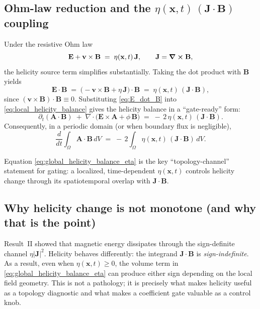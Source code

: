 \documentclass[11pt]{article}
\theoremstyle{plain}
\theoremstyle{definition}
\theoremstyle{remark}
\newcommand{\diver}{\nabla\cdot}
\newcommand{\A}{\mathbf{A}}
\newcommand{\B}{\mathbf{B}}
\newcommand{\E}{\mathbf{E}}
\newcommand{\J}{\mathbf{J}}
\newcommand{\vfield}{\mathbf{v}}
\begin{document}
\subsection{Ohm-law reduction and the $\eta(\mathbf{x},t)\,(\J\cdot\B)$ coupling}\label{sec:result_helicity_ohm}
Under the resistive Ohm law
\begin{equation}\label{eq:ohm_R3}
  \E + \vfield\times\B \;=\; \eta(\mathbf{x},t)\,\J,
  \qquad \J=\curl\B,
\end{equation}
the helicity source term simplifies substantially. Taking the dot product with $\B$ yields
\begin{equation}\label{eq:E_dot_B}
  \E\cdot\B
  \;=\;
  \big(-\vfield\times\B + \eta\,\J\big)\cdot\B
  \;=\;
  \eta(\mathbf{x},t)\,(\J\cdot\B),
\end{equation}
since $(\vfield\times\B)\cdot\B\equiv 0$. Substituting \eqref{eq:E_dot_B} into
\eqref{eq:local_helicity_balance} gives the helicity balance in a ``gate-ready'' form:
\begin{equation}\label{eq:local_helicity_balance_eta}
  \partial_t(\A\cdot\B)
  \;+\;
  \diver\!\Big(\E\times\A + \phi\,\B\Big)
  \;=\;
  -\,2\,\eta(\mathbf{x},t)\,(\J\cdot\B).
\end{equation}
Consequently, in a periodic domain (or when boundary flux is negligible),
\begin{equation}\label{eq:global_helicity_balance_eta}
  \frac{d}{dt}\int_{\Omega}\A\cdot\B\,dV
  \;=\;
  -\,2\int_{\Omega}\eta(\mathbf{x},t)\,(\J\cdot\B)\,dV.
\end{equation}

Equation \eqref{eq:global_helicity_balance_eta} is the key ``topology-channel'' statement for gating:
a localized, time-dependent $\eta(\mathbf{x},t)$ controls helicity change through its spatiotemporal
overlap with $\J\cdot\B$.

\subsection{Why helicity change is not monotone (and why that is the point)}\label{sec:result_helicity_nonmonotone}
Result~II showed that magnetic energy dissipates through the sign-definite channel $\eta|\J|^2$.
Helicity behaves differently: the integrand $\J\cdot\B$ is \emph{sign-indefinite}. As a result, even
when $\eta(\mathbf{x},t)\ge 0$, the volume term in \eqref{eq:global_helicity_balance_eta} can produce
either sign depending on the local field geometry. This is not a pathology; it is precisely what makes
helicity useful as a topology diagnostic and what makes a coefficient gate valuable as a control knob.
\end{document}
